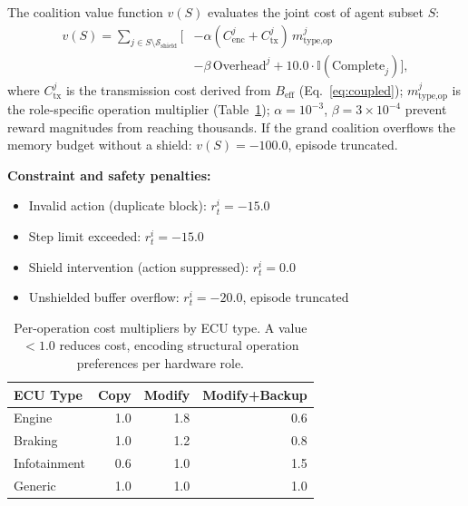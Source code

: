 \documentclass[conference]{IEEEtran}
\begin{document}
The coalition value function $v(S)$ evaluates the joint cost of agent subset $S$:
\begin{equation}
\begin{aligned}
  v(S) = \sum_{j \in S \setminus \mathcal{S}_{\text{shield}}}
  \bigl[&-\alpha(C_{\text{enc}}^j + C_{\text{tx}}^j)\,m_{\text{type},\text{op}}^j \\
        &-\beta\,\mathrm{Overhead}^j
         + 10.0\cdot\mathbb{I}(\mathrm{Complete}_j)\bigr],
\end{aligned}
  \label{eq:coalition}
\end{equation}
where $C_{\text{tx}}^j$ is the transmission cost derived from $B_{\text{eff}}$
(Eq.~\ref{eq:coupled}); $m_{\text{type},\text{op}}^j$ is the role-specific operation
multiplier (Table~\ref{tab:multipliers}); $\alpha = 10^{-3}$, $\beta = 3\times10^{-4}$
prevent reward magnitudes from reaching thousands. If the grand coalition overflows
the memory budget without a shield: $v(S)=-100.0$, episode truncated.

\textbf{Constraint and safety penalties:}
\begin{itemize}
  \item Invalid action (duplicate block): $r_t^i = -15.0$
  \item Step limit exceeded: $r_t^i = -15.0$
  \item Shield intervention (action suppressed): $r_t^i = 0.0$
  \item Unshielded buffer overflow: $r_t^i = -20.0$, episode truncated
\end{itemize}

\begin{table}[htbp]
\caption{Per-operation cost multipliers by ECU type. A value $<1.0$ reduces
cost, encoding structural operation preferences per hardware role.}
\begin{center}
\small
\begin{tabular}{lrrr}
\toprule
\textbf{ECU Type} & \textbf{Copy} & \textbf{Modify} & \textbf{Modify+Backup} \\
\midrule
Engine       & 1.0 & 1.8 & 0.6 \\
Braking      & 1.0 & 1.2 & 0.8 \\
Infotainment & 0.6 & 1.0 & 1.5 \\
Generic      & 1.0 & 1.0 & 1.0 \\
\bottomrule
\end{tabular}
\label{tab:multipliers}
\end{center}
\end{table}
\end{document}
